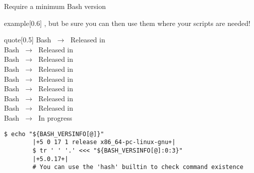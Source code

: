 
\begin{frame}[fragile]{Require a minimum Bash version}
    \vspace{-3mm}
    \begin{varblock}{example}[0.6\textwidth]{}
        , but be sure you can then use them where your scripts are needed!
    \end{varblock}
    \vspace*{-1mm}
    \begin{varblock*}{quote}[0.5\textwidth]{}
        \normalfont
        Bash  $\;\longrightarrow\;$ Released in \\
        Bash  $\;\longrightarrow\;$ Released in \\
        Bash  $\;\longrightarrow\;$ Released in \\
        Bash  $\;\longrightarrow\;$ Released in \\
        Bash  $\;\longrightarrow\;$ Released in \\
        Bash  $\;\longrightarrow\;$ Released in \\
        Bash  $\;\longrightarrow\;$ Released in \\
        Bash  $\;\longrightarrow\;$ Released in \\
        Bash  $\;\longrightarrow\;$ In progress 
    \end{varblock*}
    \begin{lstlisting}[style=MyBash, numbers=none]
        $ echo "${BASH_VERSINFO[@]}"
        |+5 0 17 1 release x86_64-pc-linux-gnu+|
        $ tr ' ' '.' <<< "${BASH_VERSINFO[@]:0:3}"
        |+5.0.17+|
        # You can use the 'hash' builtin to check command existence 
    \end{lstlisting}
\end{frame}
